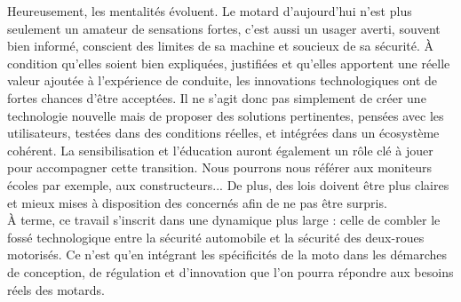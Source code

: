 Heureusement, les mentalités évoluent. Le motard d’aujourd’hui n’est plus seulement un amateur de sensations fortes, c’est aussi un usager averti, souvent bien informé, conscient des limites de sa machine et soucieux de sa sécurité. À condition qu’elles soient bien expliquées, justifiées et qu’elles apportent une réelle valeur ajoutée à l’expérience de conduite, les innovations technologiques ont de fortes chances d’être acceptées.
Il ne s’agit donc pas simplement de créer une technologie nouvelle mais de proposer des solutions pertinentes, pensées avec les utilisateurs, testées dans des conditions réelles, et intégrées dans un écosystème cohérent. La sensibilisation et l’éducation auront également un rôle clé à jouer pour accompagner cette transition. Nous pourrons nous référer aux moniteurs écoles par exemple, aux constructeurs...
De plus, des lois doivent être plus claires et mieux mises à disposition des concernés afin de ne pas être surpris.\\
À terme, ce travail s’inscrit dans une dynamique plus large : celle de combler le fossé technologique entre la sécurité automobile et la sécurité des deux-roues motorisés. Ce n’est qu’en intégrant les spécificités de la moto dans les démarches de conception, de régulation et d’innovation que l’on pourra répondre aux besoins réels des motards.
